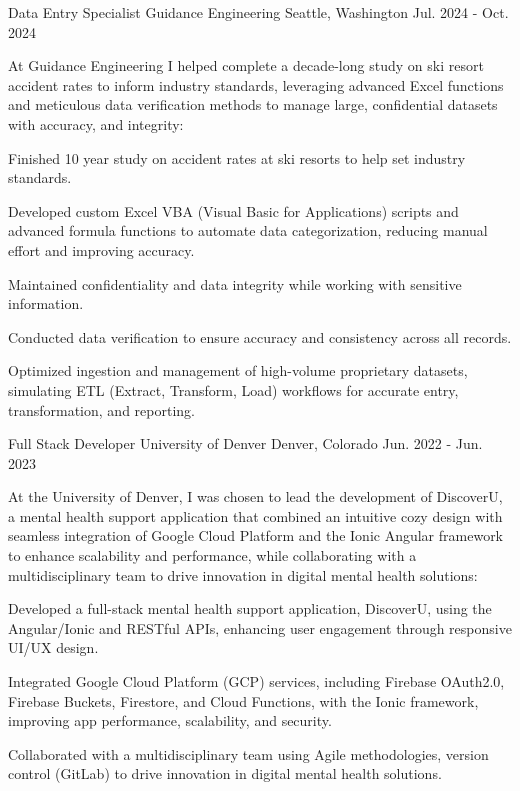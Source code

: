 \begin{cventries}
  \cventry
    {Data Entry Specialist} %
    {Guidance Engineering} %
    {Seattle, Washington} %
    {Jul. 2024 - Oct. 2024} %
    {
      At Guidance Engineering I helped complete a decade-long study on ski resort accident rates to inform industry standards, leveraging advanced Excel functions and meticulous data verification methods to manage large, confidential datasets with accuracy, and integrity:
      \begin{cvitems} %
        \item []
        \item Finished 10 year study on accident rates at ski resorts to help set industry standards.
        \item Developed custom Excel VBA (Visual Basic for Applications) scripts and advanced formula functions to automate data categorization, reducing manual effort and improving accuracy.
        \item Maintained confidentiality and data integrity while working with sensitive information.
        \item Conducted data verification to ensure accuracy and consistency across all records.
        \item Optimized ingestion and management of high-volume proprietary datasets, simulating ETL (Extract, Transform, Load) workflows for accurate entry, transformation, and reporting.
      \end{cvitems}
    }

  \cventry
    {Full Stack Developer} %
    {University of Denver} %
    {Denver, Colorado} %
    {Jun. 2022 - Jun. 2023} %
    {
      At the University of Denver, I was chosen to lead the development of DiscoverU, a mental health support application that combined an intuitive cozy design with seamless integration of Google Cloud Platform and the Ionic Angular framework to enhance scalability and performance, while collaborating with a multidisciplinary team to drive innovation in digital mental health solutions:
      \begin{cvitems}
        \item []
        \item Developed a full-stack mental health support application, DiscoverU, using the Angular/Ionic and RESTful APIs, enhancing user engagement through responsive UI/UX design.
        \item Integrated Google Cloud Platform (GCP) services, including Firebase OAuth2.0, Firebase Buckets, Firestore, and Cloud Functions, with the Ionic framework, improving app performance, scalability, and security.
        \item Collaborated with a multidisciplinary team using Agile methodologies, version control (GitLab) to drive innovation in digital mental health solutions.
        \item []
        \item []
        \item []
      \end{cvitems}
    }


\end{cventries}
